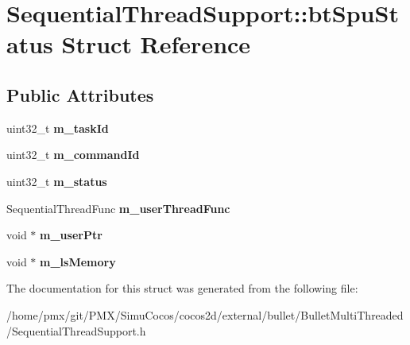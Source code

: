 \hypertarget{structSequentialThreadSupport_1_1btSpuStatus}{}\section{Sequential\+Thread\+Support\+:\+:bt\+Spu\+Status Struct Reference}
\label{structSequentialThreadSupport_1_1btSpuStatus}
\subsection*{Public Attributes}
\begin{DoxyCompactItemize}
\item 
\mbox{\label{structSequentialThreadSupport_1_1btSpuStatus_a2374b483ce4b456ef2e4bfbcdb70249a}} 
uint32\+\_\+t {\bfseries m\+\_\+task\+Id}
\item 
\mbox{\label{structSequentialThreadSupport_1_1btSpuStatus_a4472953c6cfa475a511d458a582e18d8}} 
uint32\+\_\+t {\bfseries m\+\_\+command\+Id}
\item 
\mbox{\label{structSequentialThreadSupport_1_1btSpuStatus_a9807e30211d64e90ea07cdfcc62985a0}} 
uint32\+\_\+t {\bfseries m\+\_\+status}
\item 
\mbox{\label{structSequentialThreadSupport_1_1btSpuStatus_a9ccba5b7691f909a2ffea472a641145e}} 
Sequential\+Thread\+Func {\bfseries m\+\_\+user\+Thread\+Func}
\item 
\mbox{\label{structSequentialThreadSupport_1_1btSpuStatus_aa1420b67e08aced828facddbf53d5d90}} 
void $\ast$ {\bfseries m\+\_\+user\+Ptr}
\item 
\mbox{\label{structSequentialThreadSupport_1_1btSpuStatus_a73b1742d82d237578e7dcfa650ae3aa5}} 
void $\ast$ {\bfseries m\+\_\+ls\+Memory}
\end{DoxyCompactItemize}


The documentation for this struct was generated from the following file\+:\begin{DoxyCompactItemize}
\item 
/home/pmx/git/\+P\+M\+X/\+Simu\+Cocos/cocos2d/external/bullet/\+Bullet\+Multi\+Threaded/Sequential\+Thread\+Support.\+h\end{DoxyCompactItemize}
